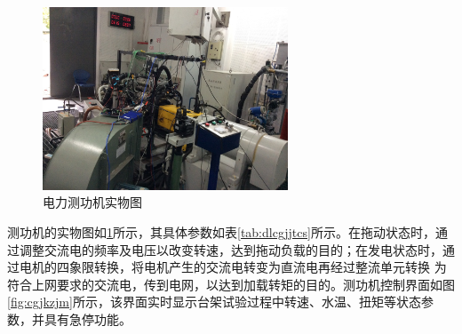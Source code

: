 \begin{figure}[H]
	\centering
	\includegraphics[width=0.65\textwidth]{thesis_figure/platformer_chapter/dlcgjswt}
	\caption{电力测功机实物图}
	\label{fig:dlcgjswt}
\end{figure}
\par 测功机的实物图如\ref{fig:dlcgjswt}所示，其具体参数如表\ref{tab:dlcgjjtcs}所示。在拖动状态时，通过调整交流电的频率及电压以改变转速，达到拖动负载的目的；在发电状态时，通过电机的四象限转换，将电机产生的交流电转变为直流电再经过整流单元转换
为符合上网要求的交流电，传到电网，以达到加载转矩的目的。测功机控制界面如图\ref{fig:cgjkzjm}所示，该界面实时显示台架试验过程中转速、水温、扭矩等状态参
数，并具有急停功能。
